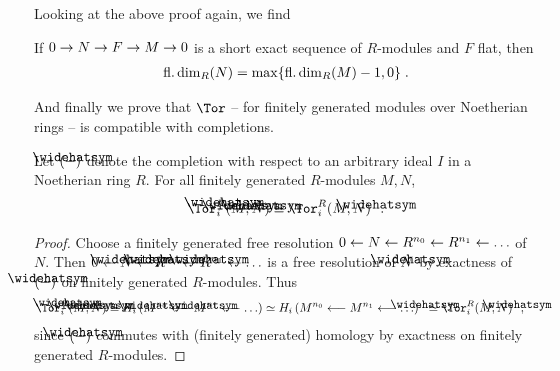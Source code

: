 \documentclass[a4paper,parskip=half,numbers=enddot, DIV=12]{scrreprt}
\begin{document}
Looking at the above proof again, we find
\begin{fact}
	If $0\morphism N\morphism F\morphism M\morphism 0$ is a short exact sequence of $R$-modules and $F$ flat, then 
	\begin{align*}
		\operatorname{fl.dim}_R(N)=\max\{\operatorname{fl.dim}_R(M)-1,0\}\;.
	\end{align*}
\end{fact}
And finally we prove that $\Tor$ -- for finitely generated modules over Noetherian rings -- is compatible with completions.
\begin{prop}
	Let $\roof{(-)}$ denote the completion with respect to an arbitrary ideal $I$ in a Noetherian ring $R$. For all finitely generated $R$-modules $M,N$,
	\begin{align*}
		\Tor_i^{\roof{R}}(\roof{M},\roof{N})\simeq \Tor_i^R(M,N)\roof{\phantom{)}}\;.
	\end{align*}
\end{prop}
\begin{proof}
	Choose a finitely generated free resolution $0\lmorphism N\lmorphism R^{n_0}\lmorphism R^{n_1}\lmorphism\ldots$ of $N$. Then $0\lmorphism \roof{N}\lmorphism \roof{R}^{n_0}\lmorphism \roof{R}^{n_1}\lmorphism\ldots$ is a free resolution of $\roof{N}$ by exactness of $\roof{(-)}$ on finitely generated $R$-modules. Thus
	\begin{align*}
		\Tor_i^{\roof{R}}(\roof{M},\roof{N})&\simeq H_i\left(\roof{M}^{n_0}\lmorphism \roof{M}^{n_1}\lmorphism\ldots\right)\simeq  H_i\left(M^{n_0}\lmorphism M^{n_1}\lmorphism\ldots\right)\roof{\phantom{)}}\simeq \Tor_i^R(M,N)\roof{\phantom{)}}\;,
	\end{align*}
	since $\roof{(-)}$ commutes with (finitely generated) homology by exactness on finitely generated $R$-modules.
\end{proof}
\end{document}
